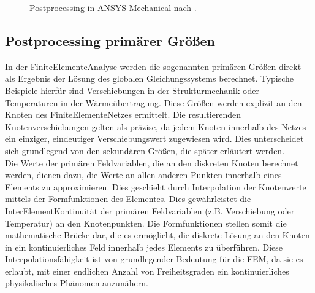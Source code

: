 \documentclass[letterpaper,10pt,german]{jupyterBook}
\let\sphinxpxdimen\pdfpxdimen\else\newdimen\sphinxpxdimen
\begin{document}
\begin{figure}[htbp]
\centering
\capstart

\noindent\sphinxincludegraphics[width=500\sphinxpxdimen]{{postproc_ansys}.png}
\caption{Postprocessing in ANSYS Mechanical nach .}\label{\detokenize{chapters/chapter3/Postprocessing:postprocansys}}\end{figure}


\subsection{Postprocessing primärer Größen}
\label{\detokenize{chapters/chapter3/Postprocessing:postprocessing-primarer-groszen}}
\sphinxAtStartPar
In der Finite\sphinxhyphen{}Elemente\sphinxhyphen{}Analyse werden die sogenannten primären Größen direkt als Ergebnis der Lösung des globalen Gleichungssystems berechnet. Typische Beispiele hierfür sind Verschiebungen in der Strukturmechanik oder Temperaturen in der Wärmeübertragung. Diese Größen werden explizit an den Knoten des Finite\sphinxhyphen{}Elemente\sphinxhyphen{}Netzes ermittelt. Die resultierenden Knotenverschiebungen gelten als präzise, da jedem Knoten innerhalb des Netzes ein einziger, eindeutiger Verschiebungswert zugewiesen wird. Dies unterscheidet sich grundlegend von den sekundären Größen, die später erläutert werden.\\
Die Werte der primären Feldvariablen, die an den diskreten Knoten berechnet werden, dienen dazu, die Werte an allen anderen Punkten innerhalb eines Elements  zu approximieren. Dies geschieht durch Interpolation der Knotenwerte mittels der Formfunktionen des Elementes.
Dies gewährleistet die Inter\sphinxhyphen{}Element\sphinxhyphen{}Kontinuität der primären Feldvariablen (z.B. Verschiebung oder Temperatur) an den Knotenpunkten. Die Formfunktionen stellen somit die mathematische Brücke dar, die es ermöglicht, die diskrete Lösung an den Knoten in ein kontinuierliches Feld innerhalb jedes Elements zu überführen. Diese Interpolationsfähigkeit ist von grundlegender Bedeutung für die FEM, da sie es erlaubt, mit einer endlichen Anzahl von Freiheitsgraden ein kontinuierliches physikalisches Phänomen anzunähern.
\end{document}
